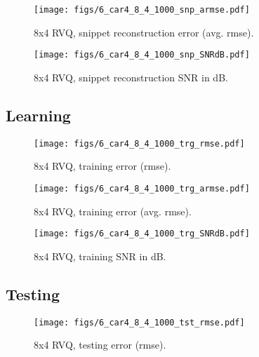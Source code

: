 								\begin{figure}[h!]
								\centering
								\texttt{[image: figs/6\_car4\_8\_4\_1000\_snp\_armse.pdf]}
								\caption{8x4 RVQ, snippet reconstruction error (avg. rmse).}
								\label{fig:6_car4_8_4_1000_snp_armse}
								\end{figure}

								\begin{figure}[h!]
								\centering
								\texttt{[image: figs/6\_car4\_8\_4\_1000\_snp\_SNRdB.pdf]}
								\caption{8x4 RVQ, snippet reconstruction SNR in dB.}
								\label{fig:6_car4_8_4_1000_snp_SNRdB}
								\end{figure}
\clearpage
\newpage
\subsection{Learning}

								\begin{figure}[h!]
								\centering
								\texttt{[image: figs/6\_car4\_8\_4\_1000\_trg\_rmse.pdf]}
								\caption{8x4 RVQ, training error (rmse).}
								\label{fig:6_car4_8_4_1000_trg_rmse}
								\end{figure}


								\begin{figure}[h!]
								\centering
								\texttt{[image: figs/6\_car4\_8\_4\_1000\_trg\_armse.pdf]}
								\caption{8x4 RVQ, training error (avg. rmse).}
								\label{fig:6_car4_8_4_1000_trg_armse}
								\end{figure}

								\begin{figure}[h!]
								\centering
								\texttt{[image: figs/6\_car4\_8\_4\_1000\_trg\_SNRdB.pdf]}
								\caption{8x4 RVQ, training SNR in dB.}
								\label{fig:6_car4_8_4_1000_trg_SNRdB}
								\end{figure}
\clearpage
\newpage
\subsection{Testing}
								\begin{figure}[h!]
								\centering
								\texttt{[image: figs/6\_car4\_8\_4\_1000\_tst\_rmse.pdf]}
								\caption{8x4 RVQ, testing error (rmse).}
								\label{fig:6_car4_8_4_1000_tst_rmse}
								\end{figure}


